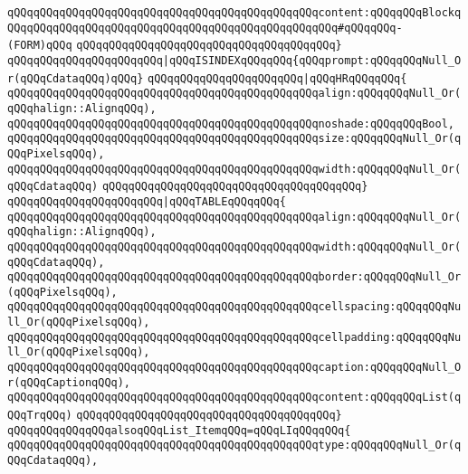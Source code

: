 \verb|qQQqqQQqqQQqqQQqqQQqqQQqqQQqqQQqqQQqqQQqqQQqqQQqcontent:qQQqqQQqBlockqQQqqQQqqQQqqQQqqQQqqQQqqQQqqQQqqQQqqQQqqQQqqQQqqQQq#qQQqqQQq-(FORM)qQQq|\newline
\verb|qQQqqQQqqQQqqQQqqQQqqQQqqQQqqQQqqQQqqQQq}|\newline
\verb|qQQqqQQqqQQqqQQqqQQqqQQq|\verb#|qQQqISINDEXqQQqqQQq{qQQqprompt:qQQqqQQqNull_Or(qQQqCdataqQQq)qQQq}#\newline
\verb|qQQqqQQqqQQqqQQqqQQqqQQq|\verb#|qQQqHRqQQqqQQq{#\newline
\verb|qQQqqQQqqQQqqQQqqQQqqQQqqQQqqQQqqQQqqQQqqQQqqQQqalign:qQQqqQQqNull_Or(qQQqhalign::AlignqQQq),|\newline
\verb|qQQqqQQqqQQqqQQqqQQqqQQqqQQqqQQqqQQqqQQqqQQqqQQqnoshade:qQQqqQQqBool,|\newline
\verb|qQQqqQQqqQQqqQQqqQQqqQQqqQQqqQQqqQQqqQQqqQQqqQQqsize:qQQqqQQqNull_Or(qQQqPixelsqQQq),|\newline
\verb|qQQqqQQqqQQqqQQqqQQqqQQqqQQqqQQqqQQqqQQqqQQqqQQqwidth:qQQqqQQqNull_Or(qQQqCdataqQQq)|\newline
\verb|qQQqqQQqqQQqqQQqqQQqqQQqqQQqqQQqqQQqqQQq}|\newline
\verb|qQQqqQQqqQQqqQQqqQQqqQQq|\verb#|qQQqTABLEqQQqqQQq{#\newline
\verb|qQQqqQQqqQQqqQQqqQQqqQQqqQQqqQQqqQQqqQQqqQQqqQQqalign:qQQqqQQqNull_Or(qQQqhalign::AlignqQQq),|\newline
\verb|qQQqqQQqqQQqqQQqqQQqqQQqqQQqqQQqqQQqqQQqqQQqqQQqwidth:qQQqqQQqNull_Or(qQQqCdataqQQq),|\newline
\verb|qQQqqQQqqQQqqQQqqQQqqQQqqQQqqQQqqQQqqQQqqQQqqQQqborder:qQQqqQQqNull_Or(qQQqPixelsqQQq),|\newline
\verb|qQQqqQQqqQQqqQQqqQQqqQQqqQQqqQQqqQQqqQQqqQQqqQQqcellspacing:qQQqqQQqNull_Or(qQQqPixelsqQQq),|\newline
\verb|qQQqqQQqqQQqqQQqqQQqqQQqqQQqqQQqqQQqqQQqqQQqqQQqcellpadding:qQQqqQQqNull_Or(qQQqPixelsqQQq),|\newline
\verb|qQQqqQQqqQQqqQQqqQQqqQQqqQQqqQQqqQQqqQQqqQQqqQQqcaption:qQQqqQQqNull_Or(qQQqCaptionqQQq),|\newline
\verb|qQQqqQQqqQQqqQQqqQQqqQQqqQQqqQQqqQQqqQQqqQQqqQQqcontent:qQQqqQQqList(qQQqTrqQQq)|\newline
\verb|qQQqqQQqqQQqqQQqqQQqqQQqqQQqqQQqqQQqqQQq}|\newline
\newline
\verb|qQQqqQQqqQQqqQQqalsoqQQqList_ItemqQQq=qQQqLIqQQqqQQq{|\newline
\verb|qQQqqQQqqQQqqQQqqQQqqQQqqQQqqQQqqQQqqQQqqQQqqQQqtype:qQQqqQQqNull_Or(qQQqCdataqQQq),|\newline
